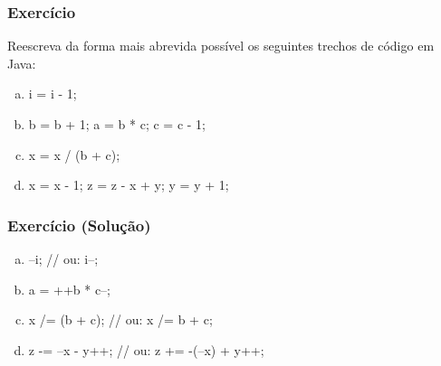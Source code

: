 \documentclass[xcolor={dvipsnames,table},aspectratio=169]{beamer}
\begin{document}
\begin{frame}[fragile]\frametitle{Exercício}
Reescreva da forma mais abrevida possível os seguintes trechos de código em Java:
\begin{enumerate}[a)]
	\item 
\begin{javacode}
i = i - 1;
\end{javacode}
	\item
\begin{javacode}
b = b + 1;
a = b * c;
c = c - 1;
\end{javacode}
	\item
\begin{javacode}
x = x / (b + c);
\end{javacode}
	\item
\begin{javacode}
x = x - 1;
z = z - x + y;
y = y + 1;
\end{javacode}
\end{enumerate}
\end{frame}

\begin{frame}[fragile]\frametitle{Exercício (Solução)}
\begin{enumerate}[a)]
	\item 
\begin{javacode}
--i;     // ou:    i--;
\end{javacode}
	\item
\begin{javacode}
a = ++b * c--;
\end{javacode}
	\item
\begin{javacode}
x /= (b + c);     // ou:    x /= b + c;
\end{javacode}
	\item
\begin{javacode}
z -= --x - y++;     // ou:    z += -(--x) + y++;
\end{javacode}
\end{enumerate}
\end{frame}
\end{document}
